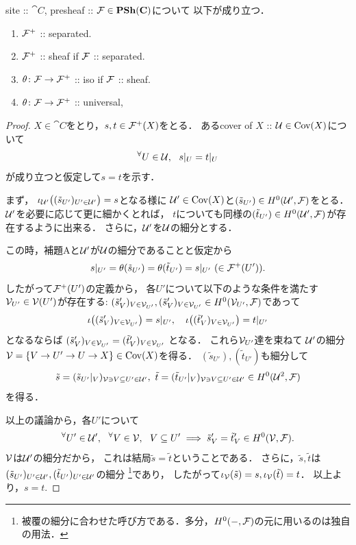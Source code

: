 \documentclass[a4paper, dvipdfmx]{jsarticle}
\begin{document}
\begin{Lemma}
    site :: $\cat{C}$, presheaf :: $\mathcal{F} \in \mathbf{PSh}(\mathbf{C})$について
    以下が成り立つ．
    \begin{enumerate}[label=(\alph*)]
        \item $\mathcal{F}^+$ :: separated. 
        \item $\mathcal{F}^+$ :: sheaf if $\mathcal{F}$ :: separated.
        \item $\theta \colon \mathcal{F} \to \mathcal{F}^+$ :: iso if $\mathcal{F}$ :: sheaf.
        \item $\theta \colon \mathcal{F} \to \mathcal{F}^+$ :: universal,
    \end{enumerate}
\end{Lemma}
\begin{proof}
    $X \in \cat{C}$をとり，$s, t \in \mathcal{F}^+(X)$をとる．
    あるcover of $X$ :: $\mathcal{U} \in \operatorname{Cov}(X)$について
    \[ {}^{\forall} U \in \mathcal{U},~~ s|_{U}=t|_{U} \]
    が成り立つと仮定して$s=t$を示す．
 
    まず，
    $\iota_{\mathcal{U}'}\big( (\tilde{s}_{U'})_{U' \in \mathcal{U}'} \big)=s$となる様に
    $\mathcal{U}' \in \operatorname{Cov}(X)$と$(\tilde{s}_{U'}) \in H^0(\mathcal{U}', \mathcal{F})$をとる．
    $\mathcal{U}'$を必要に応じて更に細かくとれば，
    $t$についても同様の$(\tilde{t}_{U'}) \in H^0(\mathcal{U}', \mathcal{F})$が存在するように出来る．
    さらに，$\mathcal{U}'$を$\mathcal{U}$の細分とする．
    
    この時，補題Aと$\mathcal{U}'$が$\mathcal{U}$の細分であることと仮定から
    \[ s|_{U'}=\theta(\tilde{s}_{U'})=\theta(\tilde{t}_{U'})=s|_{U'} \ (\in \mathcal{F}^+(U')). \]
    したがって$\mathcal{F}^+(U')$の定義から，
    各$U'$について以下のような条件を満たす$\mathcal{V}_{U'} \in \mathcal{V}(U')$が存在する:
    $(\tilde{s}'_{V})_{V \in \mathcal{V}_{U'}},
        (\tilde{s}'_{V})_{V \in \mathcal{V}_{U'}} \in H^0(\mathcal{V}_{U'}, \mathcal{F})$であって
    \[
        \iota\big( (\tilde{s}'_{V})_{V \in \mathcal{V}_{U'}} \big)=s|_{U'},\quad
        \iota\big( (\tilde{t}'_{V})_{V \in \mathcal{V}_{U'}} \big)=t|_{U'}
    \]
    となるならば
    $(\tilde{s}'_{V})_{V \in \mathcal{V}_{U'}}=(\tilde{t}'_{V})_{V \in \mathcal{V}_{U'}}$
    となる．
    これら$\mathcal{V}_{U'}$達を束ねて
    $\mathcal{U}'$の細分$\mathcal{V}=\{V \to U' \to U \to X\} \in \operatorname{Cov}(X)$を得る．
    $(\tilde{s}_{U'}), (\tilde{t}_{U'})$も細分して
    \[
        \tilde{s}=(\tilde{s}_{U'}|_{V})_{\covV \ni V \subseteq U' \in \covU'},\ 
        \tilde{t}=(\tilde{t}_{U'}|_{V})_{\covV \ni V \subseteq U' \in \covU'}
        \in H^0(\covU^2, \shF)
    \]
    を得る．
    
    以上の議論から，各$U'$について
    \[
        {}^{\forall}  U' \in \mathcal{U}' ,~~ {}^{\forall}  V \in \mathcal{V} ,~~
        V \subseteq U' \implies
        \tilde{s}'_{V}=\tilde{t}'_{V} \in H^0(\mathcal{V}, \mathcal{F}).
    \]
    $\mathcal{V}$は$\mathcal{U}'$の細分だから，
    これは結局$\tilde{s}=\tilde{t}$ということである．
    さらに，$\tilde{s}, \tilde{t}$は
    $(\tilde{s}_{U'})_{U' \in \mathcal{U}'}, (\tilde{t}_{U'})_{U' \in \mathcal{U}'}$の細分
    \footnote{ 被覆の細分に合わせた呼び方である．多分，$H^0(-, \mathcal{F})$の元に用いるのは独自の用法． }であり，
    したがって$\iota_{\mathcal{V}}(\tilde{s})=s, \iota_{\mathcal{V}}(\tilde{t})=t$．
    以上より，$s=t$.


\end{proof}
\end{document}
